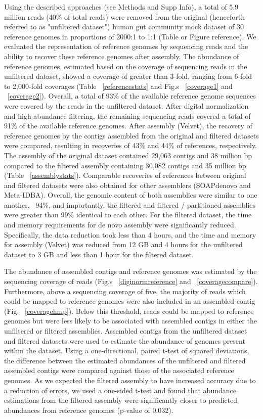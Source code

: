 \documentclass[11pt]{article} %
\begin{document}
Using the described approaches (see Methods and Supp Info), a total of 5.9 million reads (40\% of total reads) were removed from the original (henceforth referred to as "unfiltered dataset") human gut community mock dataset of 30 reference genomes in proportions of 2000:1 to 1:1 (Table or Figure reference).  We evaluated the representation of reference genomes by sequencing reads and the ability to recover these reference genomes after assembly.   The abundance of reference genomes, estimated based on the coverage of sequencing reads in the unfiltered dataset, showed a coverage of greater than 3-fold, ranging from 6-fold to 2,000-fold coverages (Table ~\ref{referencestats} and Fig.s ~\ref{coverage1} and ~\ref{coverage2}).  Overall, a total of 93\% of the available reference genome sequences were covered by the reads in the unfiltered dataset.  After digital normalization and high abundance filtering, the remaining sequencing reads covered a total of 91\% of the available reference genomes.   After assembly (Velvet), the recovery of reference genomes by the contigs assembled from the original and filtered datasets were compared, resulting in recoveries of 43\% and 44\% of references, respectively.  The assembly of the original dataset contained 29,063 contigs and 38 million bp compared to the filtered assembly containing 30,082 contigs and 35 million bp (Table ~\ref{assemblystats}).  Comparable recoveries of references between original and filtered datasets were also obtained for other assemblers (SOAPdenovo and Meta-IDBA).   Overall, the genomic content of both assemblies were similar to one another, ~94\%, and importantly, the filtered and filtered / partitioned assemblies were greater than 99\% identical to each other.  For the filtered dataset, the time and memory requirements for de novo assembly were significantly reduced.  Specifically, the data reduction took less than 4 hours, and the time and memory for assembly (Velvet) was reduced from 12 GB and 4 hours for the unfiltered dataset to 3 GB and less than 1 hour for the filtered dataset.   

The abundance of assembled contigs and reference genomes was estimated by the sequencing coverage of reads (Fig.s ~\ref{diginormreference} and ~\ref{coveragecompare}).   Furthermore, above a sequencing coverage of five, the majority of reads which could be mapped to reference genomes were also included in an assembled contig (Fig. ~\ref{coveragehmp}).  Below this threshold, reads could be mapped to reference genomes but were less likely to be associated with assembled contigs in either the unfiltered or filtered assemblies.   Assembled contigs from the unfiltered dataset and filtered datasets were used to estimate the abundance of 
genomes present within the dataset.  Using a one-directional, paired t-test of squared deviations, the difference between the estimated abundances of the unfiltered and filtered assembled contigs were compared against those of the associated reference genomes.  As we expected the filtered assembly to have increased accuracy due to a reduction of errors, we used a one-sided t-test and found that abundance estimations from the filtered assembly were significantly closer to predicted abundances from reference genomes (p-value of 0.032).  
\end{document}
